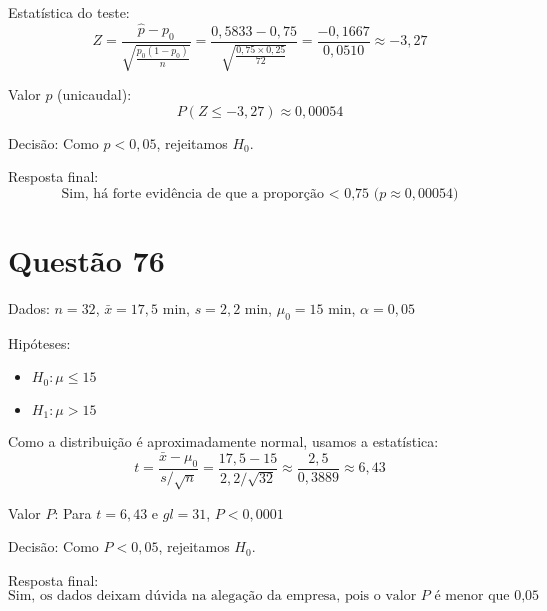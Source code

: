 \documentclass[12pt]{article}
\newcommand{\quest}[1]{\section*{Questão #1}} %
\begin{document}
Estatística do teste:
\[
Z = \frac{\hat{p} - p_0}{\sqrt{\frac{p_0(1 - p_0)}{n}}} = \frac{0{,}5833 - 0{,}75}{\sqrt{\frac{0{,}75 \times 0{,}25}{72}}} = \frac{-0{,}1667}{0{,}0510} \approx -3{,}27
\]

Valor $p$ (unicaudal):
\[
P(Z \leq -3{,}27) \approx 0{,}00054
\]

Decisão: Como $p < 0{,}05$, rejeitamos $H_0$.

Resposta final:
\[
\boxed{\text{Sim, h\'a forte evid\^encia de que a propor\c{c}\~ao < 0{,}75 ($p \approx 0{,}00054$)}}
\]


\quest{76}

Dados: $n = 32$, $\bar{x} = 17{,}5$ min, $s = 2{,}2$ min, $\mu_0 = 15$ min, $\alpha = 0{,}05$

Hip\'oteses:
\begin{itemize}
  \item $H_0: \mu \leq 15$
  \item $H_1: \mu > 15$
\end{itemize}

Como a distribui\c{c}\~ao \'{e} aproximadamente normal, usamos a estat\'istica:
\[
t = \frac{\bar{x} - \mu_0}{s / \sqrt{n}} = \frac{17{,}5 - 15}{2{,}2 / \sqrt{32}} \approx \frac{2{,}5}{0{,}3889} \approx 6{,}43
\]

Valor $P$: Para $t = 6{,}43$ e $gl = 31$, $P < 0{,}0001$

Decis\~ao: Como $P < 0{,}05$, rejeitamos $H_0$.

Resposta final:
\[
\boxed{\text{Sim, os dados deixam d\'uvida na alega\c{c}\~ao da empresa, pois o valor $P$ \'{e} menor que 0{,}05}}
\]
\end{document}
